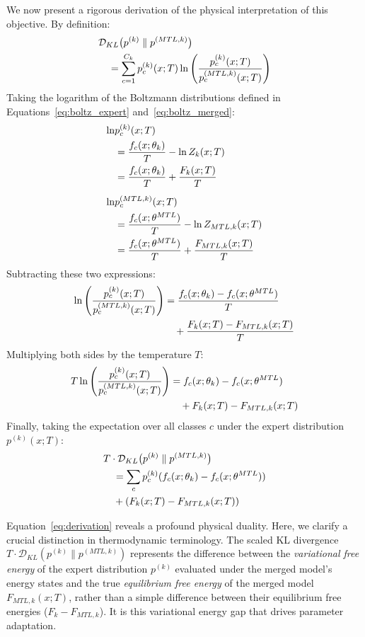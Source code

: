 We now present a rigorous derivation of the physical interpretation of this objective. By definition:
\begin{align}
&\mathcal{D}_{KL} \big( p^{(k)} \parallel p^{(MTL, k)} \big) \notag \\
&\quad = \sum_{c=1}^{C_k} p_c^{(k)}(x; T) \ln \left( \frac{p_c^{(k)}(x; T)}{p_c^{(MTL, k)}(x; T)} \right)
\end{align}
Taking the logarithm of the Boltzmann distributions defined in Equations~\eqref{eq:boltz_expert} and~\eqref{eq:boltz_merged}:
\begin{align}
\ln &p_c^{(k)}(x; T) \notag \\
&= \frac{f_c(x; \theta_k)}{T} - \ln Z_k(x; T) \notag \\
&= \frac{f_c(x; \theta_k)}{T} + \frac{F_k(x; T)}{T} \\[0.5em]
\ln &p_c^{(MTL, k)}(x; T) \notag \\
&= \frac{f_c(x; \theta^{MTL})}{T} - \ln Z_{MTL, k}(x; T) \notag \\
&= \frac{f_c(x; \theta^{MTL})}{T} + \frac{F_{MTL, k}(x; T)}{T}
\end{align}
Subtracting these two expressions:
\begin{align}
\ln \left( \frac{p_c^{(k)}(x; T)}{p_c^{(MTL, k)}(x; T)} \right) &= \frac{f_c(x; \theta_k) - f_c(x; \theta^{MTL})}{T} \notag \\
&\quad + \frac{F_k(x; T) - F_{MTL, k}(x; T)}{T}
\end{align}
Multiplying both sides by the temperature $T$:
\begin{align}
T \ln \left( \frac{p_c^{(k)}(x; T)}{p_c^{(MTL, k)}(x; T)} \right) &= f_c(x; \theta_k) - f_c(x; \theta^{MTL}) \notag \\
&\quad + F_k(x; T) - F_{MTL, k}(x; T)
\end{align}
Finally, taking the expectation over all classes $c$ under the expert distribution $p^{(k)}(x; T)$:
\begin{align}
\label{eq:derivation}
&T \cdot \mathcal{D}_{KL} \big( p^{(k)} \parallel p^{(MTL, k)} \big) \notag \\
&\quad = \sum_{c} p_c^{(k)} ( f_c(x; \theta_k) - f_c(x; \theta^{MTL}) ) \notag \\
&\quad + ( F_k(x; T) - F_{MTL, k}(x; T) )
\end{align}

Equation~\eqref{eq:derivation} reveals a profound physical duality. Here, we clarify a crucial distinction in thermodynamic terminology. The scaled KL divergence $T \cdot \mathcal{D}_{KL}(p^{(k)} \parallel p^{(MTL, k)})$ represents the difference between the \emph{variational free energy} of the expert distribution $p^{(k)}$ evaluated under the merged model's energy states and the true \emph{equilibrium free energy} of the merged model $F_{MTL, k}(x; T)$, rather than a simple difference between their equilibrium free energies ($F_k - F_{MTL, k}$). It is this variational energy gap that drives parameter adaptation.

